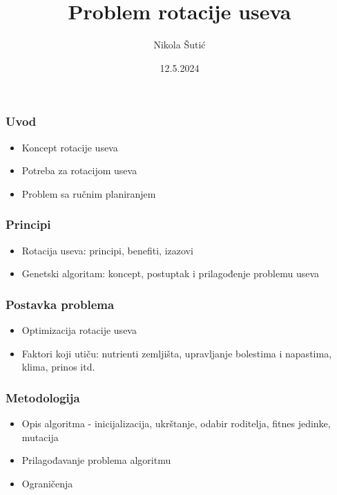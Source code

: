 \documentclass{beamer}
\title{Problem rotacije useva}
\author{Nikola Šutić}
\date{12.5.2024}
\begin{document}

\frame{\titlepage}

\begin{frame}
  \frametitle{Uvod}
  
  \begin{itemize}
  \item{Koncept rotacije useva}
  \item{Potreba za rotacijom useva}
  \item{Problem sa ručnim planiranjem}
  \end{itemize}
\end{frame}

\begin{frame}
  \frametitle{Principi}

  \begin{itemize}
  \item{Rotacija useva: principi, benefiti, izazovi}
  \item{Genetski algoritam: koncept, postuptak i prilagođenje problemu useva}
  \end{itemize}
\end{frame}

\begin{frame}
  \frametitle{Postavka problema}

  \begin{itemize}
  \item{Optimizacija rotacije useva}
  \item{Faktori koji utiču: nutrienti zemljišta, upravljanje bolestima i napastima, klima, prinos itd.}
  \end{itemize}
\end{frame}

\begin{frame}
  \frametitle{Metodologija}

  \begin{itemize}
  \item{Opis algoritma - inicijalizacija, ukrštanje, odabir roditelja, fitnes jedinke, mutacija}
  \item{Prilagođavanje problema algoritmu}
  \item{Ograničenja}
  \end{itemize}
  
\end{frame}
\end{document}

